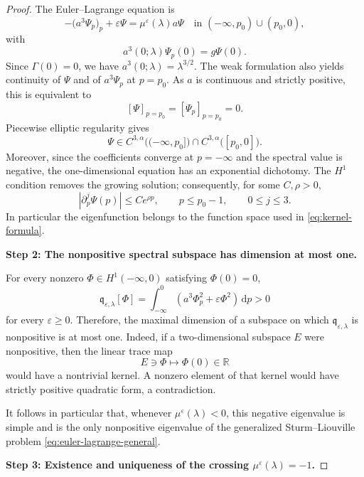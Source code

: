 \documentclass[11pt,reqno]{amsart}
\numberwithin{equation}{section}
\newcommand{\R}{\mathbb{R}}
\newcommand{\dd}{\,\mathrm{d}}
\theoremstyle{definition}
\theoremstyle{remark}
\begin{document}
\begin{proof}
The Euler--Lagrange equation is
\begin{equation}
\label{eq:euler-lagrange-general}
-\bigl(a^3\Psi_p\bigr)_p+\varepsilon\Psi
=
\mu^\varepsilon(\lambda)a\Psi
\quad\text{in }(-\infty,p_0)\cup(p_0,0),
\end{equation}
with
\[
a^3(0;\lambda)\Psi_p(0)=g\Psi(0).
\]
Since $\Gamma(0)=0$, we have $a^3(0;\lambda)=\lambda^{3/2}$.
The weak formulation also yields continuity of $\Psi$ and of
$a^3\Psi_p$ at $p=p_0$.  As $a$ is continuous and strictly positive,
this is equivalent to
\[
[\Psi]_{p=p_0}=[\Psi_p]_{p=p_0}=0.
\]
Piecewise elliptic regularity gives
\[
\Psi\in
C^{3,\alpha}\bigl((-\infty,p_0]\bigr)
\cap
C^{3,\alpha}\bigl([p_0,0]\bigr).
\]
Moreover, since the coefficients converge at $p=-\infty$ and the
spectral value is negative, the one-dimensional equation has an
exponential dichotomy.  The $H^1$ condition removes the growing
solution; consequently, for some $C,\rho>0$,
\[
 |\partial_p^j\Psi(p)|\leq Ce^{\rho p},
 \qquad p\leq p_0-1,\qquad 0\leq j\leq3.
\]
In particular the eigenfunction belongs to the function space used in
\eqref{eq:kernel-formula}.

\medskip
\noindent
\textbf{Step 2: The nonpositive spectral subspace has dimension at most one.}

For every nonzero $\Phi\in H^1(-\infty,0)$ satisfying $\Phi(0)=0$,
\[
\mathfrak q_{\varepsilon,\lambda}[\Phi]
=
\int_{-\infty}^{0}
\left(
a^3\Phi_p^2+\varepsilon\Phi^2
\right)\dd p>0
\]
for every $\varepsilon\geq0$.  Therefore, the maximal dimension of a subspace on
which $\mathfrak q_{\varepsilon,\lambda}$ is nonpositive is at most one.
Indeed, if a two-dimensional subspace $E$ were nonpositive, then the
linear trace map
\[
E\ni\Phi\longmapsto\Phi(0)\in\R
\]
would have a nontrivial kernel.  A nonzero element of that kernel
would have strictly positive quadratic form, a contradiction.

It follows in particular that, whenever
$\mu^\varepsilon(\lambda)<0$, this negative eigenvalue is simple and is the
only nonpositive eigenvalue of the generalized Sturm--Liouville
problem \eqref{eq:euler-lagrange-general}.

\medskip
\noindent
\textbf{Step 3: Existence and uniqueness of the crossing
$\mu^\varepsilon(\lambda)=-1$.}


\end{proof}
\end{document}
